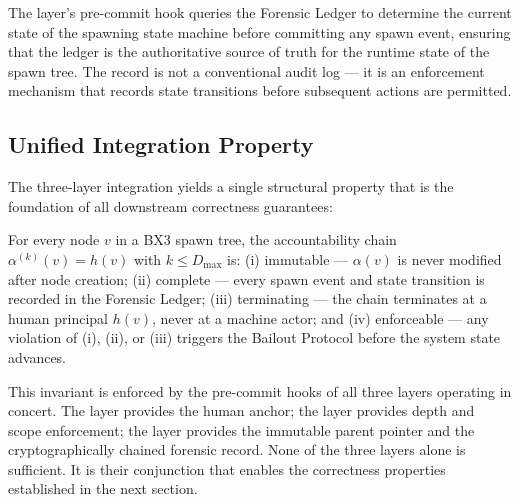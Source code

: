 The \fact{} layer's pre-commit hook queries the Forensic Ledger to determine the
current state of the spawning state machine before committing any spawn event,
ensuring that the ledger is the authoritative source of truth for the runtime
state of the spawn tree.  The record is not a conventional audit log — it is an
enforcement mechanism that records state transitions before subsequent actions
are permitted.

\subsection{Unified Integration Property}
\label{sec:rs-unified-integration}

The three-layer integration yields a single structural property that is the
foundation of all downstream correctness guarantees:

\begin{invariant}
\label{inv:spawn-accountability}
For every node $v$ in a BX3 spawn tree, the accountability chain
$\alpha^{(k)}(v) = h(v)$ with $k \leq D_{\max}$ is: (i) immutable — $\alpha(v)$
is never modified after node creation; (ii) complete — every spawn event and state
transition is recorded in the Forensic Ledger; (iii) terminating — the chain
terminates at a human principal $h(v)$, never at a machine actor; and (iv)
enforceable — any violation of (i), (ii), or (iii) triggers the Bailout Protocol
before the system state advances.
\end{invariant}

This invariant is enforced by the pre-commit hooks of all three layers operating
in concert.  The \purpose{} layer provides the human anchor; the \bounds{} layer
provides depth and scope enforcement; the \fact{} layer provides the immutable
parent pointer and the cryptographically chained forensic record.  None of the
three layers alone is sufficient.  It is their conjunction that enables the
correctness properties established in the next section.
